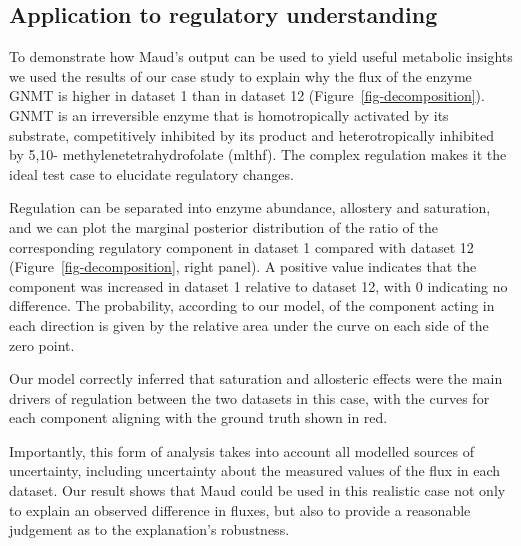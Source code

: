 \documentclass[journal=asbcd6,manuscript=article,layout=traditional]{achemso}
\begin{document}
\subsection{Application to regulatory
understanding}\label{application-to-regulatory-understanding}

To demonstrate how Maud's output can be used to yield useful metabolic
insights we used the results of our case study to explain why the flux
of the enzyme GNMT is higher in dataset 1 than in dataset 12
(Figure~\ref{fig-decomposition}). GNMT is an irreversible enzyme that is
homotropically activated by its substrate, competitively inhibited by
its product and heterotropically inhibited by 5,10-
methylenetetrahydrofolate (mlthf). The complex regulation makes it the
ideal test case to elucidate regulatory changes.

Regulation can be separated into enzyme abundance, allostery and
saturation, and we can plot the marginal posterior distribution of the
ratio of the corresponding regulatory component in dataset 1 compared
with dataset 12 (Figure~\ref{fig-decomposition}, right panel). A
positive value indicates that the component was increased in dataset 1
relative to dataset 12, with 0 indicating no difference. The
probability, according to our model, of the component acting in each
direction is given by the relative area under the curve on each side of
the zero point.

Our model correctly inferred that saturation and allosteric effects were
the main drivers of regulation between the two datasets in this case,
with the curves for each component aligning with the ground truth shown
in red.

Importantly, this form of analysis takes into account all modelled
sources of uncertainty, including uncertainty about the measured values
of the flux in each dataset. Our result shows that Maud could be used in
this realistic case not only to explain an observed difference in
fluxes, but also to provide a reasonable judgement as to the
explanation's robustness.
\end{document}
